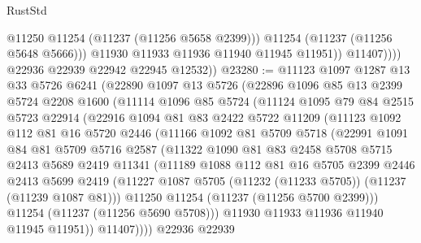 \begin{lexlean}{RustStd}
\begin{coremodule}
                        @11250
                        @11254
                        (@11237 (@11256 @5658 @2399)))
                      @11254
                      (@11237 (@11256 @5648 @5666)))
                    @11930
                    @11933
                    @11936
                    @11940
                    @11945
                    @11951))
                @11407))))
        @22936
        @22939
        @22942
        @22945
        @12532))
@23280 := @11123
    @1097
    @1287
    @13
    @33
    @5726
    @6241
    (@22890
      @1097
      @13
      @5726
      (@22896
        @1096
        @85
        @13
        @2399
        @5724
        @2208
        @1600
        (@11114
          @1096
          @85
          @5724
          (@11124
            @1095
            @79
            @84
            @2515
            @5723
            @22914
            (@22916
              @1094
              @81
              @83
              @2422
              @5722
              @11209
              (@11123
                @1092
                @112
                @81
                @16
                @5720
                @2446
                (@11166
                  @1092
                  @81
                  @5709
                  @5718
                  (@22991
                    @1091
                    @84
                    @81
                    @5709
                    @5716
                    @2587
                    (@11322
                      @1090
                      @81
                      @83
                      @2458
                      @5708
                      @5715
                      @2413
                      @5689
                      @2419
                      @11341
                      (@11189
                        @1088
                        @112
                        @81
                        @16
                        @5705
                        @2399
                        @2446
                        @2413
                        @5699
                        @2419
                        (@11227 @1087 @5705 (@11232 (@11233 @5705)) (@11237 (@11239 @1087 @81)))
                        @11250
                        @11254
                        (@11237 (@11256 @5700 @2399)))
                      @11254
                      (@11237 (@11256 @5690 @5708)))
                    @11930
                    @11933
                    @11936
                    @11940
                    @11945
                    @11951))
                @11407))))
        @22936
        @22939

\end{coremodule}
\end{lexlean}
